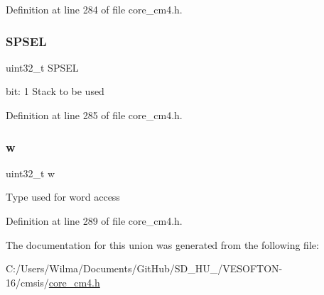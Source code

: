 Definition at line 284 of file core\+\_\+cm4.\+h.

\mbox{\label{union_c_o_n_t_r_o_l___type_ae185aac93686ffc78e998a9daf41415b}} 
\subsubsection{\texorpdfstring{S\+P\+S\+EL}{SPSEL}}
{\footnotesize\ttfamily uint32\+\_\+t S\+P\+S\+EL}

bit\+: 1 Stack to be used 

Definition at line 285 of file core\+\_\+cm4.\+h.

\mbox{\label{union_c_o_n_t_r_o_l___type_ad0fb62e7a08e70fc5e0a76b67809f84b}} 
\subsubsection{\texorpdfstring{w}{w}}
{\footnotesize\ttfamily uint32\+\_\+t w}

Type used for word access 

Definition at line 289 of file core\+\_\+cm4.\+h.



The documentation for this union was generated from the following file\+:\begin{DoxyCompactItemize}
\item 
C\+:/\+Users/\+Wilma/\+Documents/\+Git\+Hub/\+S\+D\+\_\+\+H\+U\+\_/\+V\+E\+S\+O\+F\+T\+O\+N-\/16/cmsis/\hyperlink{core__cm4_8h}{core\+\_\+cm4.\+h}\end{DoxyCompactItemize}
